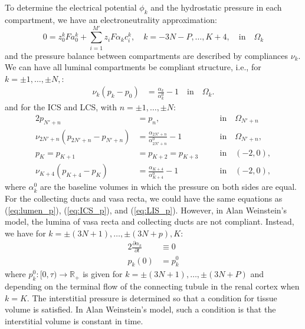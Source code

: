 \documentclass{article}
\begin{document}
To determine the electrical potential $\phi_k$ and the hydrostatic pressure in each compartment, we have an electroneutrality approximation:
\begin{equation}
    0=z_0^k Fa_0^k+\sum_{i=1}^{M'}z_iF \alpha_k c_i^k,\quad k=-3N-P,\dots,K+4,\quad\text{in}\quad \Omega_k
\end{equation}
and the pressure balance between compartments are described by compliances $\nu_k$.
We can have all luminal compartments be compliant structure, i.e., for $k=\pm 1,\dots,\pm N,$:
\begin{align}
    \nu_k(p_k - p_0) &= \frac{\alpha_k}{\alpha_k^0}-1\quad\text{in}\quad\Omega_k.\label{eq:lumen_p}
\end{align}
and for the ICS and LCS, with $n=\pm 1,\dots,\pm N$:
\begin{alignat}{2}
    p_{N'+n} &= p_n,\quad &&\text{in}\quad\Omega_{N'+n}\label{eq:ICS_p} \\ 
    \nu_{2N'+n}(p_{2N'+n} - p_{N'+n}) &= \frac{\alpha_{2N'+n}}{\alpha_{2N'+n}^0}-1\quad &&\text{in}\quad\Omega_{N'+n},\label{eq:LIS_p}\\
    p_K=p_{K+1}&=p_{K+2}=p_{K+3}\quad &&\text{in}\quad (-2,0),\\
    \nu_{K+4}(p_{K+4} - p_{K}) &= \frac{\alpha_{K+4}}{\alpha_{K+4}^0}-1\quad &&\text{in}\quad (-2,0),
\end{alignat}
where $\alpha_k^0$ are the baseline volumes in which the pressure on both sides are equal.
For the collecting ducts and vasa recta, we could have the same equations as (\ref{eq:lumen_p}), (\ref{eq:ICS_p}), and (\ref{eq:LIS_p}).
However, in Alan Weinstein's model, the lumina of vasa recta and collecting ducts are not compliant.
Instead, we have for $k=\pm (3N+1),\dots,\pm(3N+p), K$:
\begin{alignat}{2}
    \frac{\partial\alpha_k}{\partial t}&\equiv 0\\
    p_k(0) &= p_k^0
\end{alignat}
    where $p_k^0:[0,\tau)\to \mathbb{R}_+$ is given for $k=\pm (3N+1),\dots,\pm(3N+P)$ and depending on the terminal flow of the connecting tubule in the renal cortex when $k=K$.
The interstitial pressure is determined so that a condition for tissue volume is satisfied.
In Alan Weinstein's model, such a condition is that the interstitial volume is constant in time.
\end{document}
